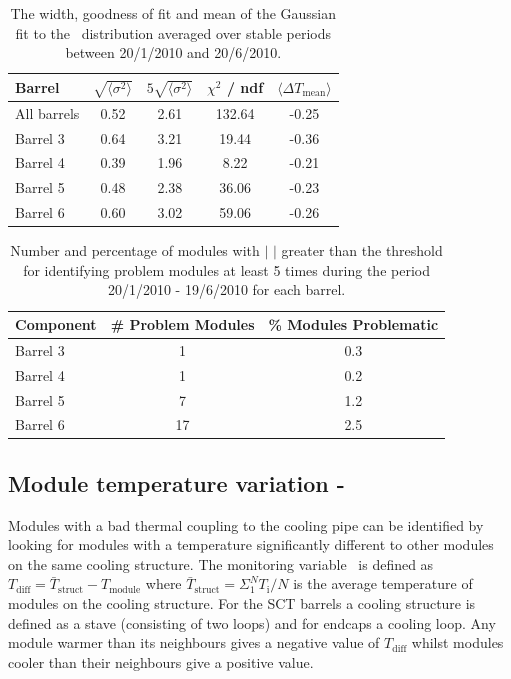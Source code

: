 \begin{table}
\centering
\begin{tabular}{ l | c  c  c  c }
\hline\hline
Barrel & $\sqrt{\langle \sigma ^ 2 \rangle }$ & $5\sqrt{\langle \sigma ^ 2 \rangle }$ & $\chi ^2 $  / ndf & $\langle \Delta T_{\mathrm{mean}} \rangle$ \\
\hline
All barrels & 0.52 & 2.61 & 132.64 & -0.25\\
Barrel 3 & 0.64 & 3.21 & 19.44 & -0.36 \\
Barrel 4 & 0.39 & 1.96 & 8.22 & -0.21 \\
Barrel 5 & 0.48 & 2.38 & 36.06 & -0.23 \\
Barrel 6 & 0.60 & 3.02 & 59.06 & -0.26 \\
\hline\hline
\end{tabular}
 \caption{The width, goodness of fit and mean of the Gaussian fit to the
 \deltat\ distribution averaged over stable periods between 20/1/2010 and 20/6/2010.}
	\label{table:dt_thresh}

\end{table}

\begin{table}
\centering
 \begin{tabular}{  l | c  c }
\hline\hline
Component & \# Problem Modules & \% Modules Problematic \\
\hline
Barrel 3 & 1 & 0.3 \\
Barrel 4 & 1 & 0.2 \\
Barrel 5 & 7 & 1.2 \\
Barrel 6 & 17 & 2.5 \\
\hline\hline
\end{tabular}
\caption{Number and percentage of modules with $|$ \deltat$|$ greater than the
threshold for identifying problem modules at least 5 times during the period
20/1/2010 - 19/6/2010 for each barrel.}
\label{table:dt_num}
\end{table}

\subsection{Module temperature variation - \tdiff\ }

Modules with a bad thermal coupling to the cooling pipe can be identified by
looking for modules with a temperature significantly different to other modules
on the same cooling structure. The monitoring variable \tdiff\ is defined as
$T_{\mathrm{diff}}  = \bar T_{\mathrm{struct}} - T_{\mathrm{module}}$ where
$\bar T_{\mathrm{struct}} = \Sigma^N_1 T_{\mathrm{i}}/N $ is the average
temperature of modules on the cooling structure. For the SCT barrels a cooling
structure is defined as a stave (consisting of two loops) and for endcaps a
cooling loop. Any module warmer than its neighbours gives a negative value of
$T_{\mathrm{diff}}$ whilst modules cooler than their neighbours give a positive
value.

